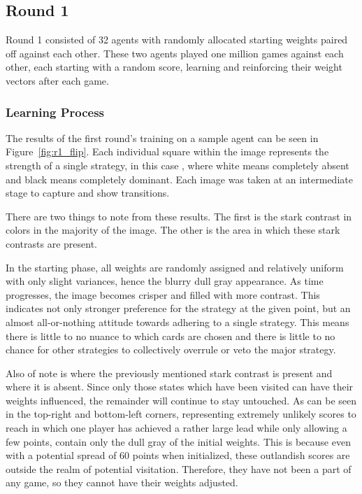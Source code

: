

\subsection{Round 1}


Round 1 consisted of 32 agents with randomly allocated starting weights
paired off against each other.
%
These two agents played one million games against each other,
each starting with a random score,
learning and reinforcing their weight vectors after each game.

\subsubsection{Learning Process}


The results of the first round's training on a sample agent can be seen
in Figure~\ref{fig:r1_flip}.
%
Each individual square within the image represents the strength of a single
strategy,
in this case \handmaxavg,
where white means completely absent and black means completely dominant.
%
Each image was taken at an intermediate stage to capture and show transitions.

There are two things to note from these results.
%
The first is the stark contrast in colors in the majority of the image.
%
The other is the area in which these stark contrasts are present.

In the starting phase,
all weights are randomly assigned and relatively uniform with only slight
variances,
hence the blurry dull gray appearance.
%
As time progresses,
the image becomes crisper and filled with more contrast.
%
This indicates not only stronger preference for the strategy at the given
point,
but an almost all-or-nothing attitude towards adhering to a single strategy.
%
This means there is little to no nuance to which cards are chosen
and there is little to no chance for other strategies to collectively overrule 
or veto the major strategy.

Also of note is where the previously mentioned stark contrast is present and
where it is absent.
%
Since only those states which have been visited can have their weights
influenced,
the remainder will continue to stay untouched.
%
As can be seen in the top-right and bottom-left corners,
representing extremely unlikely scores to reach in which one player has
achieved a rather large lead while only allowing a few points,
contain only the dull gray of the initial weights.
%
This is because even with a potential spread of 60 points when initialized,
these outlandish scores are outside the realm of potential visitation.
%
Therefore, they have not been a part of any game,
so they cannot have their weights adjusted.

